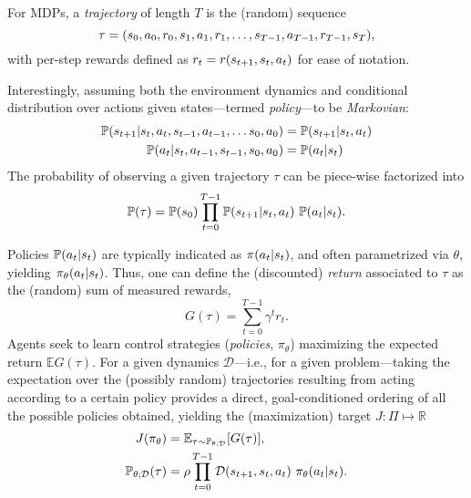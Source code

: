 For MDPs, a \emph{trajectory} of length \(T\) is the (random) sequence
\begin{equation}\label{eq:trajectory_definition}
    \tau = (s_0, a_0, r_0, s_1, a_1, r_1, \dots, s_{T-1}, a_{T-1}, r_{T-1}, s_T),
\end{equation}
with per-step rewards defined as \(r_t = r (s_{t+1}, s_t, a_t) \) for ease of notation.

Interestingly, assuming both the environment dynamics and conditional distribution over actions given states---termed \emph{policy}---to be \emph{Markovian}:
%
\begin{align}
\mathbb P(s_{t+1} \vert s_t, a_t, s_{t-1}, a_{t-1}, \dots s_0, a_0 ) &= \mathbb P (s_{t+1} \vert s_t, a_t) \label{eq:dynamics_markovian} \\
\mathbb P(a_t \vert s_t, a_{t-1}, s_{t-1}, s_0, a_0) &= \mathbb P(a_t \vert s_t) \label{eq:policy_markovian}
\end{align}
%
The probability of observing a given trajectory \( \tau \) can be piece-wise factorized into
\begin{equation}\label{eq:traj_prob}
    \mathbb P(\tau) = \mathbb P (s_0) \prod_{t=0}^{T-1} \mathbb P (s_{t+1} \vert s_t, a_t) \ \mathbb P(a_t \vert s_t).
\end{equation}

Policies \( \mathbb P(a_t \vert s_t) \) are typically indicated as \( \pi(a_t \vert s_t) \), and often parametrized via \( \theta \), yielding \( \pi_\theta (a_t \vert s_t )\).
Thus, one can define the (discounted) \emph{return} associated to \( \tau \) as the (random) sum of measured rewards,
\[
    G(\tau) = \sum_{t=0}^{T-1} \gamma^{t} r_t.
\]
Agents seek to learn control strategies (\emph{policies}, \( \pi_\theta \)) maximizing the expected return \( \mathbb E G(\tau) \). 
For a given dynamics \( \mathcal D \)---i.e., for a given problem---taking the expectation over the (possibly random) trajectories resulting from acting according to a certain policy provides a direct, goal-conditioned ordering of all the possible policies obtained, yielding the (maximization) target \( J : \Pi \mapsto \mathbb R \)
\begin{align}
    J(\pi_\theta) &= \mathbb E_{\tau \sim \mathbb P_{\theta; \mathcal D}} \left[ G(\tau) \right], \label{eq:RL-j-function} \\
    \mathbb P_{\theta; \mathcal D} (\tau) &= \rho \prod_{t=0}^{T-1} \mathcal D \transition \ \pi_\theta (\action \vert \state).\label{eq:traj-probabilities-for-policies}
\end{align}

